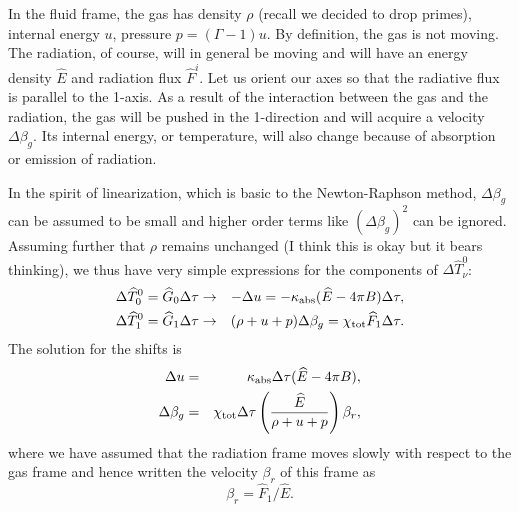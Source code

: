 \documentclass[12pt,preprint]{aastex}
\begin{document}
In the fluid frame, the gas has density $\rho$ (recall we decided to
drop primes), internal energy $u$, pressure $p=(\Gamma-1)u$. By
definition, the gas is not moving. The radiation, of course, will in
general be moving and will have an energy density $\widehat{E}$ and
radiation flux $\widehat{F}^i$.  Let us orient our axes so that the
radiative flux is parallel to the 1-axis. As a result of the
interaction between the gas and the radiation, the gas will be pushed
in the 1-direction and will acquire a velocity $\Delta\beta_g$. Its
internal energy, or temperature, will also change because of
absorption or emission of radiation. 

In the spirit of linearization, which is basic to the Newton-Raphson
method, $\Delta\beta_g$ can be assumed to be small and higher order
terms like $(\Delta\beta_g)^2$ can be ignored. Assuming further that
$\rho$ remains unchanged (I think this is okay but it bears thinking),
we thus have very simple expressions for the components of $\Delta
\widehat{T}^0_\nu$:
\begin{eqnarray}
\Delta \widehat{T}^0_0 = \widehat{G}_0\Delta\tau &\to& -\Delta u =
-\kappa_{\rm abs} (\widehat{E}-4\pi B)\Delta \tau, \\ \Delta
\widehat{T}^0_1 = \widehat{G}_1 \Delta\tau &\to&
(\rho+u+p)\Delta\beta_g = \chi_{\rm tot} \widehat{F}_1\Delta \tau.
\end{eqnarray}
The solution for the shifts is
\begin{eqnarray}
\Delta u &=& \kappa_{\rm abs}\Delta\tau (\widehat{E}-4\pi B),
\\ \Delta \beta_g &=& \chi_{\rm tot}\Delta\tau
\left(\frac{\widehat{E}}{ \rho+u+p}\right) \beta_r,
\end{eqnarray}
where we have assumed that the radiation frame moves slowly with
respect to the gas frame and hence written the velocity $\beta_r$ 
of this frame as
\begin{equation}
\beta_r = \widehat{F}_1 / \widehat{E}.
\end{equation} 
\end{document}
